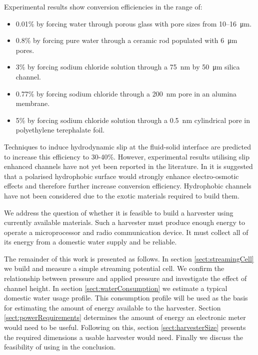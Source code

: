 \documentclass[10pt,final,journal]{IEEEtran}
\begin{document}
    Experimental results show conversion efficiencies in the range of:
    \begin{itemize}
        \item 0.01\% by forcing water through porous glass with pore sizes from 10\thinspace--\SI{16}{\micro\metre}. \cite{Yang2003}
        \item 0.8\% by forcing pure water through a ceramic rod populated with \SI{6}{\micro\metre} pores. \cite{Yang2004}
        \item 3\% by forcing sodium chloride solution through a \SI{75}{\nano\metre} by \SI{50}{\micro\metre} silica channel. \cite{Heyden2007}
        \item 0.77\% by forcing sodium chloride through a \SI{200}{\nano\metre} pore in an alumina membrane. \cite{Lu2006}
        \item 5\% by forcing sodium chloride solution through a \SI{0.5}{\nano\metre} cylindrical pore in polyethylene terephalate foil. \cite{Xie2008}
    \end{itemize}

    Techniques to induce hydrodynamic slip at the fluid-solid interface are predicted to increase this efficiency to 30-40\%. \cite{Davidson2008a, Ren2008a}
    However, experimental results utilising slip enhanced channels have not yet been reported in the literature.
    In \cite{Joly2006} it is suggested that a polarised hydrophobic surface would strongly enhance electro-osmotic effects and therefore further increase conversion efficiency.
    Hydrophobic channels have not been considered due to the exotic materials required to build them.

    We address the question of whether it is feasible to build a harvester using currently available materials.
    Such a harvester must produce enough energy to operate a microprocessor and radio communication device.
    It must collect all of its energy from a domestic water supply and be reliable.

    The remainder of this work is presented as follows.
    In section \ref{sect:streamingCell} we build and measure a simple streaming potential cell.
    We confirm the relationship between pressure and applied pressure and investigate the effect of channel height.
    In section \ref{sect:waterConsumption} we estimate a typical domestic water usage profile.
    This consumption profile will be used as the basis for estimating the amount of energy available to the harvester.
    Section \ref{sect:powerRequirements} determines the amount of energy an electronic meter would need to be useful.
    Following on this, section \ref{sect:harvesterSize} presents the required dimensions a usable harvester would need.
    Finally we discuss the feasibility of using in the conclusion.
\end{document}
